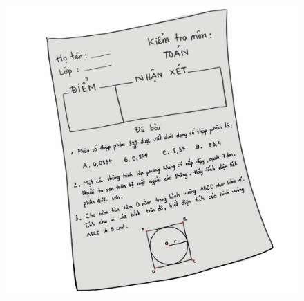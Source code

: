 \begin{multicols}{2}
\begin{figure}[H]
		\includegraphics[width=1\linewidth]{Pi4_bai6}
		\vspace*{-15pt}
	\end{figure}
\end{multicols}
%

